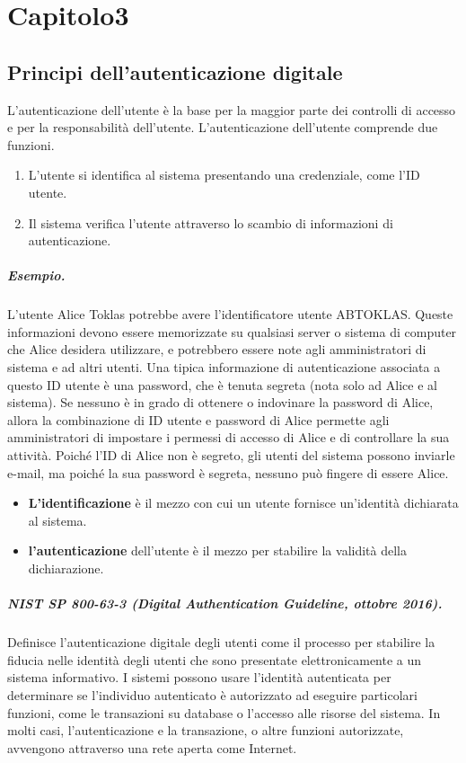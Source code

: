 \newpage
\chapter{Capitolo3}
\section{Principi dell'autenticazione digitale}
L'autenticazione dell'utente è la base per la maggior parte dei controlli di accesso e per la responsabilità dell'utente.
L'autenticazione dell'utente comprende due funzioni.

\begin{enumerate}
    \centering
    \item L'utente si identifica al sistema presentando una credenziale, come l'ID utente.
    \item Il sistema verifica l'utente attraverso lo scambio di informazioni di autenticazione.
\end{enumerate}

\paragraph{Esempio.} L'utente Alice Toklas potrebbe avere l'identificatore utente ABTOKLAS. Queste informazioni devono essere memorizzate su qualsiasi server o sistema di computer che Alice desidera utilizzare, e potrebbero essere note agli amministratori di sistema e ad altri utenti. Una tipica informazione di autenticazione associata a questo ID utente è una password, che è tenuta segreta (nota solo ad Alice e al sistema). Se nessuno è in grado di ottenere o indovinare la password di Alice, allora la combinazione di ID utente e password di Alice permette agli amministratori di impostare i permessi di accesso di Alice e di controllare la sua attività. Poiché l'ID di Alice non è segreto, gli utenti del sistema possono inviarle e-mail, ma poiché la sua password è segreta, nessuno può fingere di essere Alice.

\begin{itemize}
    \item \textbf{L'identificazione} è il mezzo con cui un utente fornisce un'identità dichiarata al sistema.
    \item \textbf{l'autenticazione} dell'utente è il mezzo per stabilire la validità della dichiarazione.
\end{itemize}

\paragraph{NIST SP 800-63-3 (Digital Authentication Guideline, ottobre 2016).}
Definisce l'autenticazione digitale degli utenti come il processo per stabilire la fiducia nelle identità degli utenti che sono presentate elettronicamente a un sistema informativo. I sistemi possono usare l'identità autenticata per determinare se l'individuo autenticato è autorizzato ad eseguire particolari funzioni, come le transazioni su database o l'accesso alle risorse del sistema. In molti casi, l'autenticazione e la transazione, o altre funzioni autorizzate, avvengono attraverso una rete aperta come Internet.

